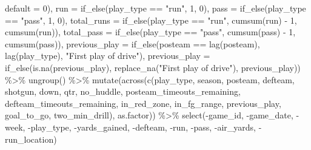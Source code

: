 \documentclass[
  letterpaper,
]{krantz}
\newenvironment{Shaded}{\begin{snugshade}}{\end{snugshade}}
\newcommand{\AttributeTok}[1]{\textcolor[rgb]{0.40,0.45,0.13}{#1}}
\newcommand{\DecValTok}[1]{\textcolor[rgb]{0.68,0.00,0.00}{#1}}
\newcommand{\FunctionTok}[1]{\textcolor[rgb]{0.28,0.35,0.67}{#1}}
\newcommand{\NormalTok}[1]{\textcolor[rgb]{0.00,0.23,0.31}{#1}}
\newcommand{\SpecialCharTok}[1]{\textcolor[rgb]{0.37,0.37,0.37}{#1}}
\newcommand{\StringTok}[1]{\textcolor[rgb]{0.13,0.47,0.30}{#1}}
\begin{document}
\begin{Shaded}
\begin{Highlighting}[]
      \AttributeTok{default =} \DecValTok{0}\NormalTok{),}
    \AttributeTok{run =} \FunctionTok{if\_else}\NormalTok{(play\_type }\SpecialCharTok{==} \StringTok{"run"}\NormalTok{, }\DecValTok{1}\NormalTok{, }\DecValTok{0}\NormalTok{),}
    \AttributeTok{pass =} \FunctionTok{if\_else}\NormalTok{(play\_type }\SpecialCharTok{==} \StringTok{"pass"}\NormalTok{, }\DecValTok{1}\NormalTok{, }\DecValTok{0}\NormalTok{),}
    \AttributeTok{total\_runs =} \FunctionTok{if\_else}\NormalTok{(play\_type }\SpecialCharTok{==} \StringTok{"run"}\NormalTok{,}
                         \FunctionTok{cumsum}\NormalTok{(run) }\SpecialCharTok{{-}} \DecValTok{1}\NormalTok{, }\FunctionTok{cumsum}\NormalTok{(run)),}
    \AttributeTok{total\_pass =} \FunctionTok{if\_else}\NormalTok{(play\_type }\SpecialCharTok{==} \StringTok{"pass"}\NormalTok{,}
                         \FunctionTok{cumsum}\NormalTok{(pass) }\SpecialCharTok{{-}} \DecValTok{1}\NormalTok{, }\FunctionTok{cumsum}\NormalTok{(pass)),}
    \AttributeTok{previous\_play =} \FunctionTok{if\_else}\NormalTok{(posteam }\SpecialCharTok{==} \FunctionTok{lag}\NormalTok{(posteam),}
                            \FunctionTok{lag}\NormalTok{(play\_type),}
                            \StringTok{"First play of drive"}\NormalTok{),}
    \AttributeTok{previous\_play =} \FunctionTok{if\_else}\NormalTok{(}\FunctionTok{is.na}\NormalTok{(previous\_play),}
                            \FunctionTok{replace\_na}\NormalTok{(}\StringTok{"First play of drive"}\NormalTok{),}
\NormalTok{                            previous\_play)) }\SpecialCharTok{\%\textgreater{}\%}
  \FunctionTok{ungroup}\NormalTok{() }\SpecialCharTok{\%\textgreater{}\%}
  \FunctionTok{mutate}\NormalTok{(}\FunctionTok{across}\NormalTok{(}\FunctionTok{c}\NormalTok{(play\_type, season, posteam, defteam,}
\NormalTok{                  shotgun, down, qtr, no\_huddle,}
\NormalTok{                  posteam\_timeouts\_remaining,}
\NormalTok{                  defteam\_timeouts\_remaining, in\_red\_zone,}
\NormalTok{                  in\_fg\_range, previous\_play, goal\_to\_go,}
\NormalTok{                  two\_min\_drill), as.factor)) }\SpecialCharTok{\%\textgreater{}\%}
  \FunctionTok{select}\NormalTok{(}\SpecialCharTok{{-}}\NormalTok{game\_id, }\SpecialCharTok{{-}}\NormalTok{game\_date, }\SpecialCharTok{{-}}\NormalTok{week, }\SpecialCharTok{{-}}\NormalTok{play\_type,}
         \SpecialCharTok{{-}}\NormalTok{yards\_gained, }\SpecialCharTok{{-}}\NormalTok{defteam, }\SpecialCharTok{{-}}\NormalTok{run, }\SpecialCharTok{{-}}\NormalTok{pass,}
         \SpecialCharTok{{-}}\NormalTok{air\_yards, }\SpecialCharTok{{-}}\NormalTok{run\_location)}
\end{Highlighting}
\end{Shaded}
\end{document}

